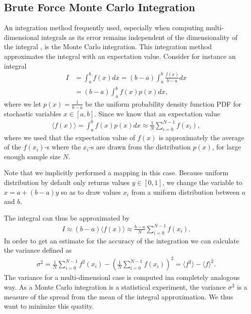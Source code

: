\documentclass[10pt, twocolumn]{aastex62}
\begin{document}
\subsection{Brute Force Monte Carlo Integration}\label{subsec:brute_force_monte_carlo}
An integration method frequently used, especially when computing
multi-dimensional integrals as its error remains independent of the
dimensionality of the integral \citep[p. 343-344]{jensen:2015}, is the Monte Carlo integration. This integration method
approximates the integral with an expectation value. Consider for instance an
integral 
\begin{align}
	I &= \int^b_a f(x)dx = (b-a)\int^b_a\frac{f(x)}{b-a}dx \\	
	&= (b-a)\int^b_af(x)p(x)dx,
\end{align}
where we let $p(x) = \frac{1}{b-a}$ be the uniform probability density function
PDF for stochastic variables $x\in[a, b]$. Since we know that an expectation
value 
\begin{align}
	\langle f(x)\rangle = \int^b_a f(x)p(x)dx \approx \frac{1}{N}\sum_{i=0}^{N-1} f(x_i),
\end{align}
where we used that the expectation value of $f(x)$ is approximately the average
of the $f(x_i)$-s where the $x_i$-s are drawn from the distribution $p(x)$, for
large enough sample size $N$. 

Note that we implicitly performed a mapping in this case. Because uniform
distribution by default only returns values $y\in[0, 1]$, we change the variable
to $x = a + (b-a)y$ so as to draw values $x_i$ from a uniform distribution
between $a$ and $b$. 

The integral can thus be approximated by 
\begin{align}
	I \approx (b-a)\langle f(x) \rangle \approx \frac{b-a}{N}\sum^{N-1}_{i=0}f(x_i).
\end{align}
In order to get an estimate for the accuracy of the integration we can calculate
the variance defined as 
\begin{align}
	\sigma^2 = \frac{1}{N}\sum_{i=0}^{N-1} f^2(x_i) - \left(\frac{1}{N}\sum_{i=0}^{N-1}f(x_i)\right)^2 = \langle f^2\rangle - \langle f\rangle^2.
\end{align}
The variance for a multi-dimensionl case is computed ina completely analogous way.
As a Monte Carlo integration is a statistical experiment, the variance
$\sigma^2$ is a measure of the spread from the mean of the integral
approximation. We thus want to minimize this quatity.
\end{document}
